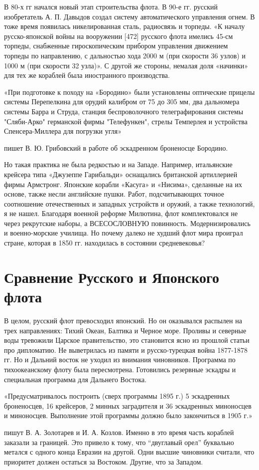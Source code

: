 В 80-х гг начался новый этап строительства флота. В 90-е гг. русский изобретатель А. П. Давыдов создал систему автоматического управления огнем. В тоже время появилась никелированная сталь, радиосвязь и торпеды. «К началу русско-японской войны на вооружении [472] русского флота имелись 45-см торпеды, снабженные гироскопическим прибором управления движением торпеды по направлению, с дальностью хода 2000 м (при скорости 36 узлов) и 1000 м (при скорости 32 узла)».
С другой же стороны, немалая доля «начинки» для тех же кораблей была иностранного производства.
\begin{textcitation}
«При подготовке к походу на «Бородино» были установлены оптические прицелы системы Перепелкина для орудий калибром от 75 до 305 мм, два дальномера системы Барра и Струда, станция беспроволочного телеграфирования системы "Сляби-Арко" германской фирмы "Телефункен", стрелы Темперлея и устройства Спенсера-Миллера для погрузки угля»
\end{textcitation}
 пишет В. Ю. Грибовский в работе об эскадренном броненосце Бородино.

Но такая практика не была редкостью и на Западе. Например, итальянские крейсера типа «Джузеппе Гарибальди» оснащались британской артиллерией фирмы Армстронг. Японские корабли «Касуга» и «Нисима», сделанные на их основе, также несли английские пушки. Работ, подсчитывающих точное соотношение отечественных и западных устройств и оружий, а также технологий, я не нашел.
Благодаря военной реформе Милютина, флот комплектовался не через рекрутские наборы, а ВСЕСОСЛОВНУЮ повинность. Модернизировались и военно-морские училища.
Но почему далеко не худший флот мира проиграл стране, которая в 1850 гг. находилась в состоянии средневековья?

\section{Сравнение Русского и Японского флота}

В целом, русский флот превосходил японский. Но он оказывался распылен на трех направлениях: Тихий Океан, Балтика и Черное море. Проливы и северные воды тревожили Царское правительство, это становится ясно из прошлой статьи про дипломатию. Не выветрилась из памяти и русско-турецкая война 1877-1878 гг.
Но и Дальний восток не уходил из внимания чиновников. Программа по тихоокеанскому флоту была пересмотрена. Готовились резервные эскадры и специальная программа для Дальнего Востока.
\begin{textcitation}
 «Предусматривалось построить (сверх программы 1895 г.) 5 эскадренных броненосцев, 16 крейсеров, 2 минных заградителя и 36 эскадренных миноносцев и миноносцев. Выполнение этой программы должно было закончиться в 1905 г.»
\end{textcitation}
пишут В. А. Золотарев и И. А. Козлов. Именно в это время часть кораблей заказали за границей.
Это привело к тому, что “двуглавый орел” буквально метался с одного конца Евразии на другой. Одни высшие чиновники считали, что приоритет должен остаться за Востоком. Другие, что за Западом.

